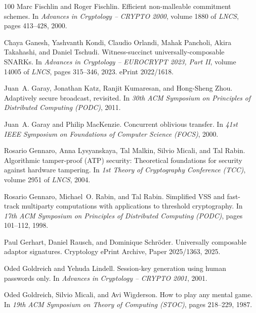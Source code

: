\documentclass[11pt,a4paper]{article}
\begin{document}
\begin{thebibliography}{100}
Marc Fischlin and Roger Fischlin.
\newblock Efficient non-malleable commitment schemes.
\newblock In {\em Advances in Cryptology -- CRYPTO 2000}, volume 1880 of {\em
  LNCS}, pages 413--428, 2000.

Chaya Ganesh, Yashvanth Kondi, Claudio Orlandi, Mahak Pancholi, Akira
  Takahashi, and Daniel Tschudi.
\newblock Witness-succinct universally-composable {SNARK}s.
\newblock In {\em Advances in Cryptology -- EUROCRYPT 2023, Part II}, volume
  14005 of {\em LNCS}, pages 315--346, 2023.
\newblock ePrint 2022/1618.

Juan~A. Garay, Jonathan Katz, Ranjit Kumaresan, and Hong-Sheng Zhou.
\newblock Adaptively secure broadcast, revisited.
\newblock In {\em 30th ACM Symposium on Principles of Distributed Computing
  (PODC)}, 2011.

Juan~A. Garay and Philip MacKenzie.
\newblock Concurrent oblivious transfer.
\newblock In {\em 41st IEEE Symposium on Foundations of Computer Science
  (FOCS)}, 2000.

Rosario Gennaro, Anna Lysyanskaya, Tal Malkin, Silvio Micali, and Tal Rabin.
\newblock Algorithmic tamper-proof ({ATP}) security: Theoretical foundations
  for security against hardware tampering.
\newblock In {\em 1st Theory of Cryptography Conference (TCC)}, volume 2951 of
  {\em LNCS}, 2004.

Rosario Gennaro, Michael~O. Rabin, and Tal Rabin.
\newblock Simplified {VSS} and fast-track multiparty computations with
  applications to threshold cryptography.
\newblock In {\em 17th ACM Symposium on Principles of Distributed Computing
  (PODC)}, pages 101--112, 1998.

Paul Gerhart, Daniel Rausch, and Dominique Schr{\"o}der.
\newblock Universally composable adaptor signatures.
\newblock Cryptology ePrint Archive, Paper 2025/1363, 2025.

Oded Goldreich and Yehuda Lindell.
\newblock Session-key generation using human passwords only.
\newblock In {\em Advances in Cryptology -- CRYPTO 2001}, 2001.

Oded Goldreich, Silvio Micali, and Avi Wigderson.
\newblock How to play any mental game.
\newblock In {\em 19th ACM Symposium on Theory of Computing (STOC)}, pages
  218--229, 1987.


\end{thebibliography}
\end{document}
